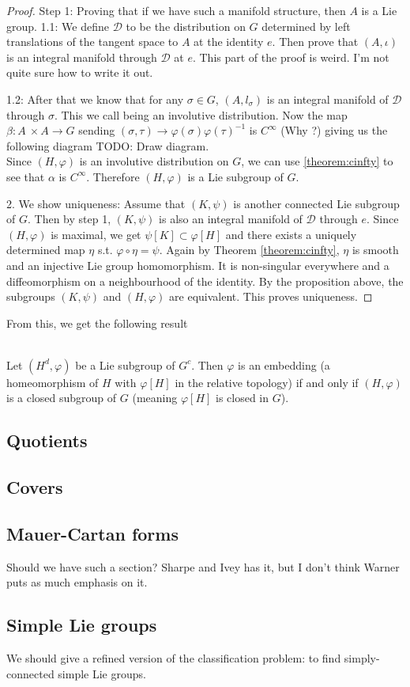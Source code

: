 \begin{proof}
Step 1: Proving that if we have such a manifold structure, then $A$ is a Lie group.
1.1: We define $\mathcal{D}$ to be the distribution on $G$ determined by left translations of the tangent space to $A$ at the identity $e$. Then prove that $(A,\iota)$ is an integral manifold through $\mathcal{D}$ at $e$. This part of the proof is weird. I'm not quite sure how to write it out. 

1.2:
After that we know that for any $\sigma \in G$, $(A,l_{\sigma})$ is an integral manifold of $\mathcal{D}$ through $\sigma$. This we call being an involutive distribution. Now the map $\beta \colon A\ \times A \to G$ sending $(\sigma,\tau) \to \varphi(\sigma)\varphi(\tau)^{-1}$ is $C^{\infty}$ (Why ?) giving us the following diagram 
TODO: Draw diagram. \\
Since $(H,\varphi)$ is an involutive distribution on $G$, we can use \ref{theorem:cinfty} to see that $\alpha$ is $C^{\infty}$. Therefore $(H,\varphi)$ is a Lie subgroup of $G$. 


2. We show uniqueness: Assume that $(K,\psi)$ is another connected Lie subgroup of $G$. Then by step 1, $(K,\psi)$ is also an integral manifold of $\mathcal{D}$ through $e$. Since $(H,\varphi)$ is maximal, we get $\psi[K] \subset \varphi[H]$ and there exists a uniquely determined map $\eta$ s.t. $\varphi \circ \eta = \psi$. Again by Theorem \ref{theorem:cinfty}, $\eta$ is smooth and an injective Lie group homomorphism. It is non-singular everywhere and a diffeomorphism on a neighbourhood of the identity. By the proposition above, the subgroups $(K,\psi)$ and $(H,\varphi)$ are equivalent. This proves uniqueness.
\end{proof}
From this, we get the following result
\begin{theorem}
\textup{\cite[3.21]{Warner1983}}\\
Let $(H^d,\varphi)$ be a Lie subgroup of $G^c$. Then $\varphi$ is an embedding (a homeomorphism of $H$ with $\varphi[H]$ in the relative topology) if and only if $(H,\varphi)$ is a closed subgroup of $G$ (meaning $\varphi[H]$ is closed in $G$).
\end{theorem}

\subsection{Quotients}


\subsection{Covers}


\subsection{Mauer-Cartan forms}
Should we have such a section? Sharpe and Ivey has it, but I don't think Warner puts as much emphasis on it.


\subsection{Simple Lie groups}
We should give a refined version of the classification problem: to find simply-connected simple Lie groups.
